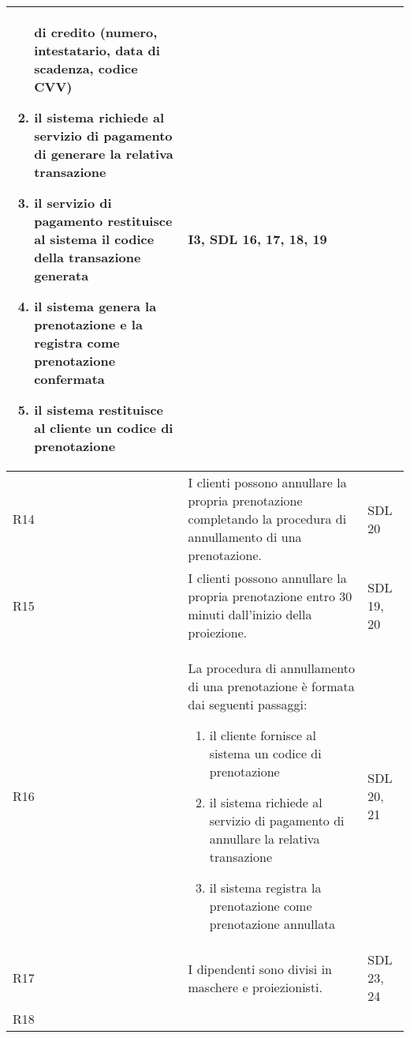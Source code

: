 \begin{longtable}{|p{0.8cm}|p{13.4cm}|p{2.1cm}|}
\begin{enumerate}
                  di credito (numero, intestatario, data di scadenza,
                  codice CVV)
            \item il sistema richiede al servizio di pagamento di
                  generare la relativa transazione
            \item il servizio di pagamento restituisce al sistema
                  il codice della transazione generata
            \item il sistema genera la prenotazione e la registra
                  come prenotazione confermata
            \item il sistema restituisce al cliente un codice di
                  prenotazione
      \end{enumerate}                   &
      I3, SDL 16, 17, 18, 19
      \\\hline
      R14                                                                     &
      I clienti possono annullare la propria prenotazione completando la
      procedura di annullamento di una prenotazione.                          &
      SDL 20
      \\\hline
      R15                                                                     &
      I clienti possono annullare la propria prenotazione entro 30 minuti
      dall'inizio della proiezione.                                           &
      SDL 19, 20
      \\\hline
      R16                                                                     &
      La procedura di annullamento di una prenotazione è formata dai
      seguenti passaggi:
      \begin{enumerate}
            \item il cliente fornisce al sistema un codice di
                  prenotazione
            \item il sistema richiede al servizio di pagamento di
                  annullare la relativa transazione
            \item il sistema registra la prenotazione come prenotazione
                  annullata
      \end{enumerate}             &
      SDL 20, 21
      \\\hline
      R17                                                                     &
      I dipendenti sono divisi in maschere e proiezionisti.                   &
      SDL 23, 24
      \\\hline
      R18                                                                     &

\end{longtable}
